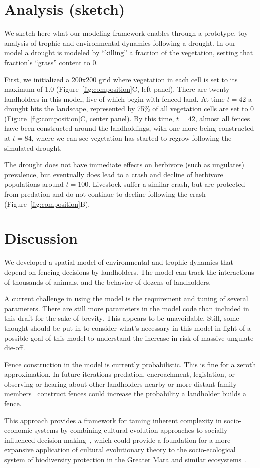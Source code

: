 \documentclass{article}
\begin{document}
\section{Analysis (sketch)}

We sketch here what our modeling framework enables through a prototype, toy
analysis of trophic and environmental dynamics following a drought. In our
model a drought is modeled by ``killing'' a fraction of the vegetation,
setting that fraction's ``grass'' content to 0.  

First, we initialized a 200x200 grid where vegetation in each cell is set to
its maximum of 1.0 (Figure~\ref{fig:composition}C, left panel). There are
twenty landholders in this model, five of which begin with fenced land. At
time $t=42$ a drought hits the landscape, represented by 75\% of all 
vegetation cells are set to 0 (Figure~\ref{fig:composition}C, center panel). 
By this time, $t=42$, almost all fences have
been constructed around the landholdings, with one more being constructed at 
$t=84$, where we can see vegetation has started to regrow following the
simulated drought. 

The drought does not have immediate effects on herbivore (such as ungulates) 
prevalence, but eventually does lead to a crash and decline of herbivore
populations around $t=100$. Livestock suffer a similar crash, but are
protected from predation and do not continue to decline following the crash
(Figure~\ref{fig:composition}B).


\section{Discussion}

We developed a spatial model of environmental and trophic dynamics
that depend on fencing decisions by landholders. The model can track
the interactions of thousands of animals, and the behavior of dozens of
landholders. 

A current challenge in using the model is the requirement and tuning of 
several parameters. There are still more parameters in the model code
than included in this draft for the sake of brevity. This appears to be
unavoidable. Still, some thought should be put in to consider what's
necessary in this model in light of a possible goal of this model to 
understand the increase in risk of massive ungulate die-off.  

Fence construction in the model is currently probabilistic. This is fine
for a zeroth approximation. In future iterations predation, encroachment,
legislation, or observing or hearing about other landholders nearby or 
more distant family
members~\cite{Pisor2024} construct fences could increase
the probability a landholder builds a fence.

This approach provides a framework for taming inherent complexity in
socio-economic systems by combining cultural evolution approaches to
socially-influenced decision making~\cite{PisorLansingMagargal2023},
which could provide a foundation for a more expansive application of cultural
evolutionary theory to the socio-ecological system of biodiversity
protection in the Greater Mara and similar 
ecosystems~\cite{Brooks2018,Currie2024}.


\printbibliography
\end{document}
